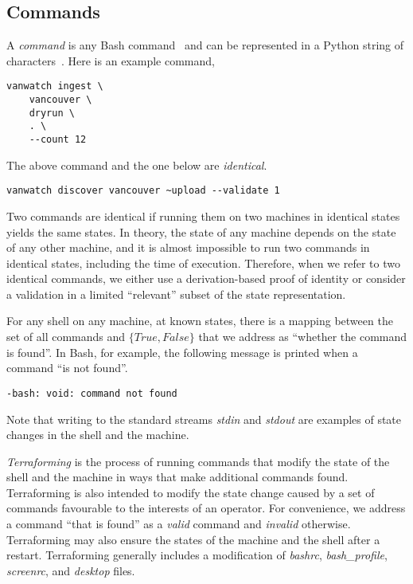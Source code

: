 \subsection{Commands}
\label{commands}

A \emph{command} is any Bash command~ and can be represented in a Python string of characters~. Here is an example command,
%
\begin{verbatim}
vanwatch ingest \
    vancouver \
    dryrun \
    . \
    --count 12
\end{verbatim}
%
The above command and the one below are \emph{identical}.
%
\begin{verbatim}
vanwatch discover vancouver ~upload --validate 1
\end{verbatim}
%
Two commands are identical if running them on two machines in identical states yields the same states. In theory, the state of any machine depends on the state of any other machine, and it is almost impossible to run two commands in identical states, including the time of execution. Therefore, when we refer to two identical commands, we either use a derivation-based proof of identity or consider a validation in a limited ``relevant'' subset of the state representation.

For any shell on any machine, at known states, there is a mapping between the set of all commands and $\{True,False\}$ that we address as ``whether the command is found''. In Bash, for example, the following message is printed when a command ``is not found''.
%
\begin{verbatim}
-bash: void: command not found
\end{verbatim}
%
Note that writing to the standard streams \emph{stdin} and \emph{stdout} are examples of state changes in the shell and the machine. 

\emph{Terraforming} is the process of running commands that modify the state of the shell and the machine in ways that make additional commands found. Terraforming is also intended to modify the state change caused by a set of commands favourable to the interests of an operator. For convenience, we address a command ``that is found'' as a \emph{valid} command and \emph{invalid} otherwise. Terraforming may also ensure the states of the machine and the shell after a restart. Terraforming generally includes a modification of \emph{bashrc}, \emph{bash\_profile}, \emph{screenrc}, and \emph{desktop} files.

